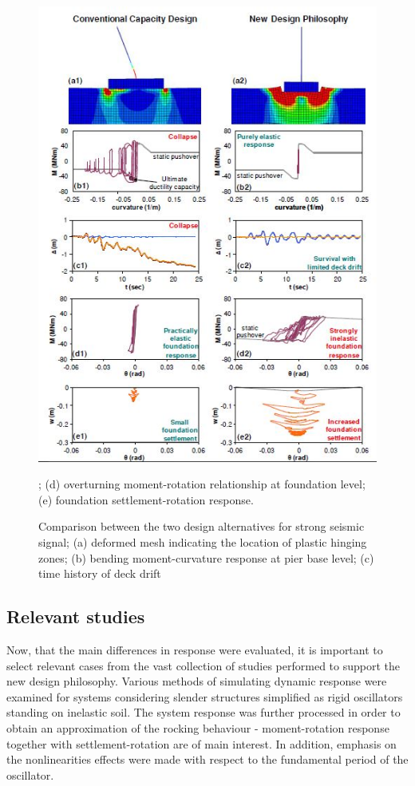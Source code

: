 \documentclass[12pt,a4paper]{report}
\begin{document}
\begin{figure}[h!]
	\centering
	\includegraphics[width=0.8\linewidth]{"conventional"}
	\caption{Comparison between the two design alternatives for strong seismic signal; (a) deformed mesh indicating the location of plastic hinging zones; (b) bending moment-curvature response at pier base level; (c) time history of deck drift}; (d) overturning moment-rotation relationship at foundation level; (e) foundation settlement-rotation response.
	\label{conventional}
\end{figure}


\subsection{Relevant studies}
Now, that the main differences in response were evaluated, it is important to select \mbox{relevant} cases from the vast collection of studies performed to support the new design philosophy. Various methods of simulating dynamic response were examined for systems considering slender structures simplified as rigid oscillators standing on inelastic soil. The system response was further processed in order to obtain an approximation of the rocking behaviour - moment-rotation response together with settlement-rotation are of main interest. In addition, emphasis on the nonlinearities effects were made with respect to the fundamental period of the oscillator.
\end{document}
